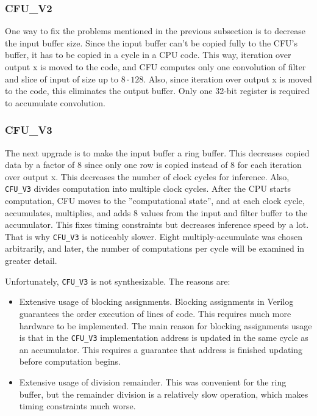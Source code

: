 \subsubsection{CFU\_V2}
One way to fix the problems mentioned in the previous subsection is to decrease the input buffer size. Since the input buffer can't be copied fully to the CFU's buffer, it has to be copied in a cycle in a CPU code. This way, iteration over output x is moved to the code, and CFU computes only one convolution of filter and slice of input of size up to $8 \cdot 128$. Also, since iteration over output x is moved to the code, this eliminates the output buffer. Only one 32-bit register is required to accumulate convolution. 

\subsubsection{CFU\_V3}
The next upgrade is to make the input buffer a ring buffer. This decreases copied data by a factor of 8 since only one row is copied instead of 8 for each iteration over output x. This decreases the number of clock cycles for inference. Also, \verb|CFU_V3| divides computation into multiple clock cycles. After the CPU starts computation, CFU moves to the ''computational state'', and at each clock cycle, accumulates, multiplies, and adds 8 values from the input and filter buffer to the accumulator. This fixes timing constraints but decreases inference speed by a lot. That is why \verb|CFU_V3| is noticeably slower. Eight multiply-accumulate was chosen arbitrarily, and later, the number of computations per cycle will be examined in greater detail. 

Unfortunately, \verb|CFU_V3| is not synthesizable. The reasons are:
\begin{itemize}
    \item Extensive usage of blocking assignments. Blocking assignments in Verilog guarantees the order execution of lines of code. This requires much more hardware to be implemented. The main reason for blocking assignments usage is that in the \verb|CFU_V3| implementation address is updated in the same cycle as an accumulator. This requires a guarantee that address is finished updating before computation begins.
    \item Extensive usage of division remainder. This was convenient for the ring buffer, but the remainder division is a relatively slow operation, which makes timing constraints much worse.
\end{itemize}

